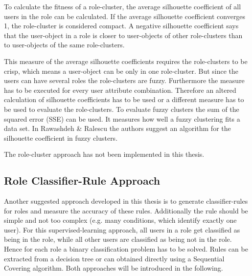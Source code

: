         To calculate the fitness of a role-cluster, the average silhouette coefficient of all users in the role can be calculated. If the average silhouette coefficient converges 1, the role-cluster is considered compact. A negative silhouette coefficient says that the user-object in a role is closer to user-objects of other role-clusters than to user-objects of the same role-clusters.
        
        This measure of the average silhouette coefficients requires the role-clusters to be crisp, which means a user-object can be only in one role-cluster. But since the users can have several roles the role-clusters are fuzzy. Furthermore the measure has to be executed for every user attribute combination. Therefore an altered calculation of silhouette coefficients has to be used or a different measure has to be used to evaluate the role-clusters. To evaluate fuzzy clusters the sum of the squared error (SSE) can be used\cite{Han}. It measures how well a fuzzy clustering fits a data set. In Rawashdeh \& Ralescu\cite{rawashdeh2012fuzzy} the authors suggest an algorithm for the silhouette coefficient in fuzzy clusters.
        
        The role-cluster approach has not been implemented in this thesis.
        
        \subsection{Role Classifier-Rule Approach}
        \label{sec:classifierRule}
        Another suggested approach developed in this thesis is to generate classifier-rules for roles and measure the accuracy of these rules. Additionally the rule should be simple and not too complex (e.g. many conditions, which identify exactly one user). For this supervised-learning approach, all users in a role get classified as being in the role, while all other users are classified as being not in the role. Hence for each role a binary classification problem has to be solved. Rules can be extracted from a decision tree or can obtained directly using a Sequential Covering algorithm\cite{Han}. Both approaches will be introduced in the following.
        
